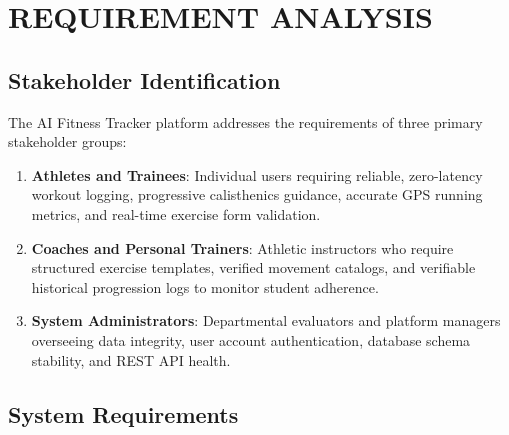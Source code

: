 \documentclass[12pt,a4paper]{report}
\begin{document}
\chapter{REQUIREMENT ANALYSIS}

\section{Stakeholder Identification}
The AI Fitness Tracker platform addresses the requirements of three primary stakeholder groups:
\begin{enumerate}
    \item \textbf{Athletes and Trainees}: Individual users requiring reliable, zero-latency workout logging, progressive calisthenics guidance, accurate GPS running metrics, and real-time exercise form validation.
    \item \textbf{Coaches and Personal Trainers}: Athletic instructors who require structured exercise templates, verified movement catalogs, and verifiable historical progression logs to monitor student adherence.
    \item \textbf{System Administrators}: Departmental evaluators and platform managers overseeing data integrity, user account authentication, database schema stability, and REST API health.
\end{enumerate}

\section{System Requirements}
\end{document}

